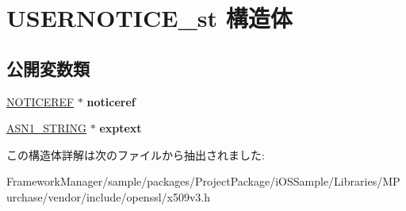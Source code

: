 \hypertarget{struct_u_s_e_r_n_o_t_i_c_e__st}{}\section{U\+S\+E\+R\+N\+O\+T\+I\+C\+E\+\_\+st 構造体}
\label{struct_u_s_e_r_n_o_t_i_c_e__st}
\subsection*{公開変数類}
\begin{DoxyCompactItemize}
\item 
\hypertarget{struct_u_s_e_r_n_o_t_i_c_e__st_a5d1c9ae026549fc43f6443d1df42b956}{}\hyperlink{struct_n_o_t_i_c_e_r_e_f__st}{N\+O\+T\+I\+C\+E\+R\+E\+F} $\ast$ {\bfseries noticeref}\label{struct_u_s_e_r_n_o_t_i_c_e__st_a5d1c9ae026549fc43f6443d1df42b956}

\item 
\hypertarget{struct_u_s_e_r_n_o_t_i_c_e__st_a7009a63ef5ede50320b870f832a50ecd}{}\hyperlink{structasn1__string__st}{A\+S\+N1\+\_\+\+S\+T\+R\+I\+N\+G} $\ast$ {\bfseries exptext}\label{struct_u_s_e_r_n_o_t_i_c_e__st_a7009a63ef5ede50320b870f832a50ecd}

\end{DoxyCompactItemize}


この構造体詳解は次のファイルから抽出されました\+:\begin{DoxyCompactItemize}
\item 
Framework\+Manager/sample/packages/\+Project\+Package/i\+O\+S\+Sample/\+Libraries/\+M\+Purchase/vendor/include/openssl/x509v3.\+h\end{DoxyCompactItemize}
